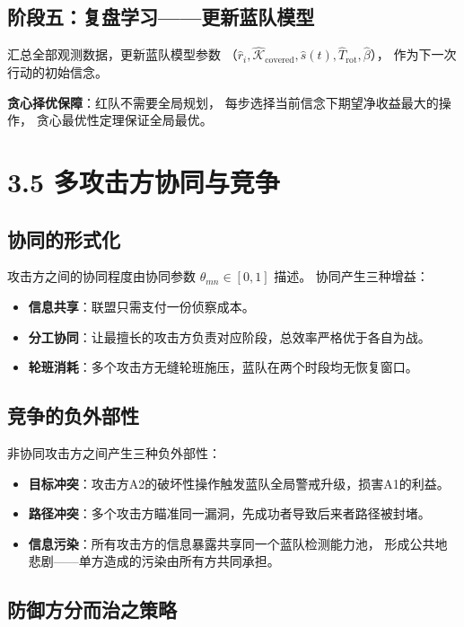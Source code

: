 \documentclass[11pt,a4paper]{article}
\begin{document}
\subsection{阶段五：复盘学习——更新蓝队模型}

汇总全部观测数据，更新蓝队模型参数
（$\hat{r}_i, \hat{\mathcal{K}}_{\text{covered}}, \hat{s}(t), \hat{T}_{\text{rot}}, \hat{\beta}$），
作为下一次行动的初始信念。

\textbf{贪心择优保障}：红队不需要全局规划，
每步选择当前信念下期望净收益最大的操作，
贪心最优性定理保证全局最优。

\section{3.5 多攻击方协同与竞争}

\subsection{协同的形式化}

攻击方之间的协同程度由协同参数 $\theta_{mn} \in [0,1]$ 描述。
协同产生三种增益：
\begin{itemize}
    \item \textbf{信息共享}：联盟只需支付一份侦察成本。
    \item \textbf{分工协同}：让最擅长的攻击方负责对应阶段，总效率严格优于各自为战。
    \item \textbf{轮班消耗}：多个攻击方无缝轮班施压，蓝队在两个时段均无恢复窗口。
\end{itemize}

\subsection{竞争的负外部性}

非协同攻击方之间产生三种负外部性：
\begin{itemize}
    \item \textbf{目标冲突}：攻击方A2的破坏性操作触发蓝队全局警戒升级，损害A1的利益。
    \item \textbf{路径冲突}：多个攻击方瞄准同一漏洞，先成功者导致后来者路径被封堵。
    \item \textbf{信息污染}：所有攻击方的信息暴露共享同一个蓝队检测能力池，
          形成公共地悲剧——单方造成的污染由所有方共同承担。
\end{itemize}

\subsection{防御方分而治之策略}
\end{document}
